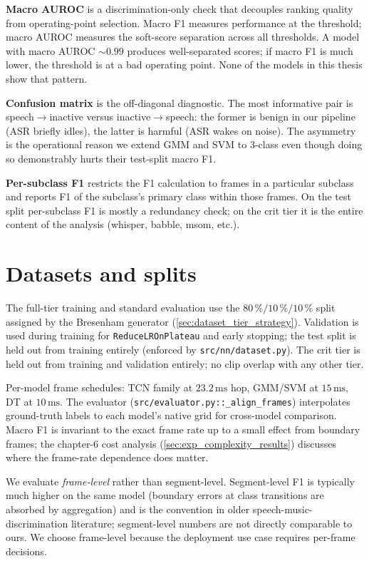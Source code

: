 \textbf{Macro AUROC} is a discrimination-only check that decouples ranking quality from operating-point selection.
Macro F1 measures performance at the threshold; macro AUROC measures the soft-score separation across all thresholds.
A model with macro AUROC $\sim 0.99$ produces well-separated scores; if macro F1 is much lower, the threshold is at a bad operating point.
None of the models in this thesis show that pattern.

\textbf{Confusion matrix} is the off-diagonal diagnostic.
The most informative pair is speech$\to$inactive versus inactive$\to$speech: the former is benign in our pipeline (ASR briefly idles), the latter is harmful (ASR wakes on noise).
The asymmetry is the operational reason we extend GMM and SVM to 3-class even though doing so demonstrably hurts their test-split macro F1.

\textbf{Per-subclass F1} restricts the F1 calculation to frames in a particular subclass and reports F1 of the subclass's primary class within those frames.
On the test split per-subclass F1 is mostly a redundancy check; on the crit tier it is the entire content of the analysis (whisper, babble, msom, etc.).

\section{Datasets and splits}
\label{sec:eval_splits}

The full-tier training and standard evaluation use the $80\,\% / 10\,\% / 10\,\%$ split assigned by the Bresenham generator (\cref{sec:dataset_tier_strategy}).
Validation is used during training for \texttt{ReduceLROnPlateau} and early stopping; the test split is held out from training entirely (enforced by \texttt{src/nn/dataset.py}).
The crit tier is held out from training and validation entirely; no clip overlap with any other tier.

Per-model frame schedules: TCN family at $23.2\,\text{ms}$ hop, GMM/SVM at $15\,\text{ms}$, DT at $10\,\text{ms}$.
The evaluator (\texttt{src/evaluator.py::\_align\_frames}) interpolates ground-truth labels to each model's native grid for cross-model comparison.
Macro F1 is invariant to the exact frame rate up to a small effect from boundary frames; the chapter-6 cost analysis (\cref{sec:exp_complexity_results}) discusses where the frame-rate dependence does matter.

We evaluate \emph{frame-level} rather than segment-level.
Segment-level F1 is typically much higher on the same model (boundary errors at class transitions are absorbed by aggregation) and is the convention in older speech-music-discrimination literature; segment-level numbers are not directly comparable to ours.
We choose frame-level because the deployment use case requires per-frame decisions.

